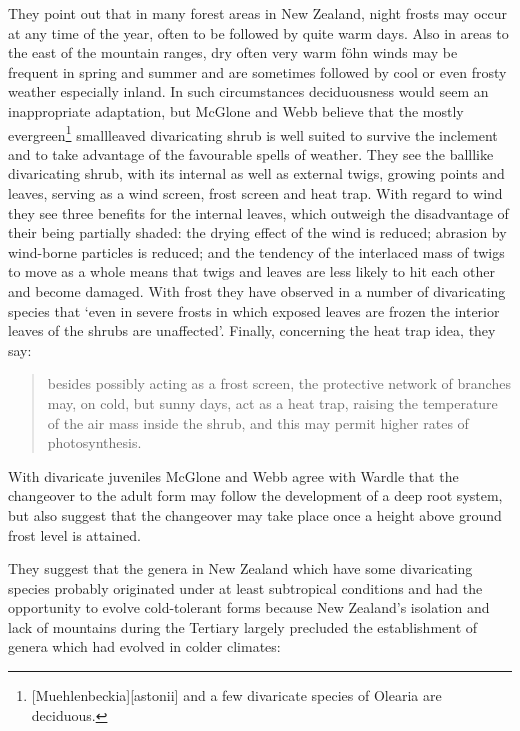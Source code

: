 They point out that in many forest areas in New Zealand, night frosts may occur at any time of the year, often to be followed by quite warm days.
Also in areas to the east of the mountain ranges, dry often very warm föhn winds may be frequent in spring and summer and are sometimes followed by cool or even frosty weather especially inland.
In such circumstances deciduousness would seem an inappropriate adaptation, but McGlone and Webb believe that the mostly evergreen\footnote{[Muehlenbeckia][astonii] and a few divaricate species of Olearia are deciduous.} smallleaved divaricating shrub is well suited to survive the inclement and to take advantage of the favourable spells of weather.
They see the balllike divaricating shrub, with its internal as well as external twigs, growing points and leaves, serving as a wind screen, frost screen and heat trap.
With regard to wind they see three benefits for the internal leaves, which outweigh the disadvantage of their being partially shaded: the drying effect of the wind is reduced; abrasion by wind-borne particles is reduced; and the tendency of the interlaced mass of twigs to move as a whole means that twigs and leaves are less likely to hit each other and become damaged.
With frost they have observed in a number of divaricating species that `even in severe frosts in which exposed leaves are frozen the interior leaves of the shrubs are unaffected'.
Finally, concerning the heat trap idea, they say:

\begin{quote}
	besides possibly acting as a frost screen, the protective network of branches may, on cold, but sunny days, act as a heat trap, raising the temperature of the air mass inside the shrub, and this may permit higher rates of photosynthesis.
\end{quote}

With divaricate juveniles McGlone and Webb agree with Wardle that the changeover to the adult form may follow the development of a deep root system, but also suggest that the changeover may take place once a height above ground frost level is attained.

They suggest that the genera in New Zealand which have some divaricating species probably originated under at least subtropical conditions and had the opportunity to evolve cold-tolerant forms because New Zealand's isolation and lack of mountains during the Tertiary largely precluded the establishment of genera which had evolved in colder climates:

